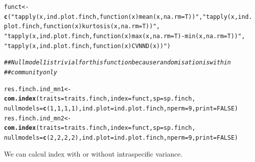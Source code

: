 \documentclass[12pt]{article}\usepackage[]{graphicx}\usepackage[]{color}
\makeatletter
\newcommand{\hlnum}[1]{\textcolor[rgb]{0.686,0.059,0.569}{#1}}%
\newcommand{\hlstr}[1]{\textcolor[rgb]{0.192,0.494,0.8}{#1}}%
\newcommand{\hlcom}[1]{\textcolor[rgb]{0.678,0.584,0.686}{\textit{#1}}}%
\newcommand{\hlstd}[1]{\textcolor[rgb]{0.345,0.345,0.345}{#1}}%
\newcommand{\hlkwb}[1]{\textcolor[rgb]{0.69,0.353,0.396}{#1}}%
\newcommand{\hlkwc}[1]{\textcolor[rgb]{0.333,0.667,0.333}{#1}}%
\newcommand{\hlkwd}[1]{\textcolor[rgb]{0.737,0.353,0.396}{\textbf{#1}}}%
\newenvironment{kframe}{%
 \def\at@end@of@kframe{}%
 \ifinner\ifhmode%
  \def\at@end@of@kframe{\end{minipage}}%
  \begin{minipage}{\columnwidth}%
 \fi\fi%
 \def\FrameCommand##1{\hskip\@totalleftmargin \hskip-\fboxsep
 \colorbox{shadecolor}{##1}\hskip-\fboxsep
     \hskip-\linewidth \hskip-\@totalleftmargin \hskip\columnwidth}%
 \MakeFramed {\advance\hsize-\width
   \@totalleftmargin\z@ \linewidth\hsize
   \@setminipage}}%
 {\par\unskip\endMakeFramed%
 \at@end@of@kframe}
\newenvironment{knitrout}{}{} %
\makeatother
\begin{document}
\begin{knitrout}
\color{fgcolor}\begin{kframe}
\begin{alltt}
\hlstd{funct} \hlkwb{<-} \hlkwd{c}\hlstd{(}\hlstr{"tapply(x, ind.plot.finch, function(x) mean(x, na.rm=T))"}\hlstd{,} \hlstr{"tapply(x, ind.plot.finch, function(x) kurtosis(x, na.rm=T))"}\hlstd{,}
    \hlstr{"tapply(x, ind.plot.finch, function(x) max(x, na.rm=T)-min(x, na.rm=T))"}\hlstd{,}
    \hlstr{"tapply(x, ind.plot.finch, function(x) CVNND(x))"}\hlstd{)}

\hlcom{## Null model 1 is trivial for this function because randomisation is within}
\hlcom{## community only}

\hlstd{res.finch.ind_mn1} \hlkwb{<-} \hlkwd{com.index}\hlstd{(}\hlkwc{traits} \hlstd{= traits.finch,} \hlkwc{index} \hlstd{= funct,} \hlkwc{sp} \hlstd{= sp.finch,}
    \hlkwc{nullmodels} \hlstd{=} \hlkwd{c}\hlstd{(}\hlnum{1}\hlstd{,} \hlnum{1}\hlstd{,} \hlnum{1}\hlstd{,} \hlnum{1}\hlstd{),} \hlkwc{ind.plot} \hlstd{= ind.plot.finch,} \hlkwc{nperm} \hlstd{=} \hlnum{9}\hlstd{,} \hlkwc{print} \hlstd{=} \hlnum{FALSE}\hlstd{)}
\hlstd{res.finch.ind_mn2} \hlkwb{<-} \hlkwd{com.index}\hlstd{(}\hlkwc{traits} \hlstd{= traits.finch,} \hlkwc{index} \hlstd{= funct,} \hlkwc{sp} \hlstd{= sp.finch,}
    \hlkwc{nullmodels} \hlstd{=} \hlkwd{c}\hlstd{(}\hlnum{2}\hlstd{,} \hlnum{2}\hlstd{,} \hlnum{2}\hlstd{,} \hlnum{2}\hlstd{),} \hlkwc{ind.plot} \hlstd{= ind.plot.finch,} \hlkwc{nperm} \hlstd{=} \hlnum{9}\hlstd{,} \hlkwc{print} \hlstd{=} \hlnum{FALSE}\hlstd{)}
\end{alltt}
\end{kframe}
\end{knitrout}



We can calcul index with or without intraspecific variance.
\end{document}

